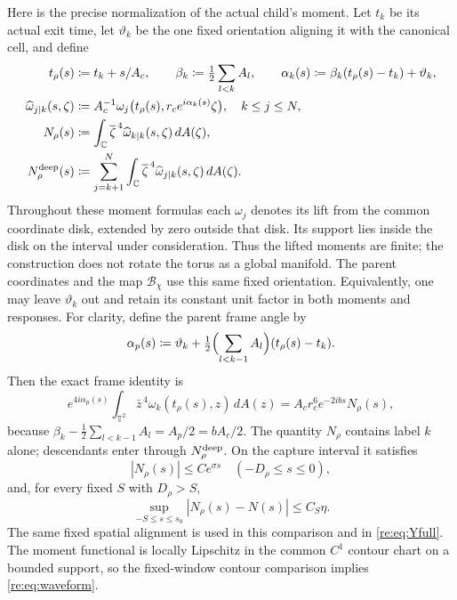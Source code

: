 \documentclass[11pt]{amsart}
\theoremstyle{remark}
\numberwithin{equation}{section}
\newcommand{\C}{\mathbb C}
\newcommand{\T}{\mathbb T}
\begin{document}
Here is the precise normalization of the actual child's moment.
Let $t_k$ be its actual exit time, let $\vartheta_k$ be the one fixed
orientation aligning it with the canonical cell, and define
\begin{align}\label{re:def:normalized-moment}
 t_\rho(s)&\coloneqq t_k+s/A_c,\qquad
 \beta_k\coloneqq\tfrac12\sum_{l<k}A_l,\qquad
 \alpha_k(s)\coloneqq\beta_k(t_\rho(s)-t_k)+\vartheta_k,\\
 \widehat\omega_{j\mid k}(s,\zeta)
 &\coloneqq A_c^{-1}\omega_j\bigl(t_\rho(s),
                  r_c e^{i\alpha_k(s)}\zeta\bigr),\quad k\le j\le N,
 \nonumber\\
 N_\rho(s)&\coloneqq\int_\C\overline\zeta^{\,4}
                        \widehat\omega_{k\mid k}(s,\zeta)\,dA(\zeta),
 \nonumber\\
 N_\rho^{\rm deep}(s)&\coloneqq\sum_{j=k+1}^N\int_\C
       \overline\zeta^{\,4}\widehat\omega_{j\mid k}(s,\zeta)\,dA(\zeta).
 \nonumber
\end{align}
Throughout these moment formulas each $\omega_j$ denotes its lift from the common
coordinate disk, extended by zero outside that disk. Its support lies
inside the disk on the interval under consideration. Thus the lifted
moments are finite; the construction does not rotate the torus as a
global manifold.
The parent coordinates and the map $\mathcal B_\chi$ use this same
fixed orientation. Equivalently, one may leave $\vartheta_k$ out and
retain its constant unit factor in both moments and responses.
For clarity, define the parent frame angle by
\[
 \alpha_p(s)\coloneqq\vartheta_k+
       \tfrac12\Bigl(\sum_{l<k-1}A_l\Bigr)(t_\rho(s)-t_k).
\]
Then the exact frame identity is
\begin{equation}\label{re:def:frame-identity}
 e^{4i\alpha_p(s)}\int_{\T^2}\bar z^{\,4}
       \omega_k(t_\rho(s),z)\,dA(z)
 =A_cr_c^6 e^{-2ibs}N_\rho(s),
\end{equation}
because $\beta_k-\tfrac12\sum_{l<k-1}A_l=A_p/2=bA_c/2$.
The quantity $N_\rho$ contains label $k$ alone; descendants enter
through $N_\rho^{\rm deep}$. On the capture interval it satisfies
\[
 |N_\rho(s)|\leq C e^{\sigma s}\quad(-D_\rho\leq s\leq0),
\]
and, for every fixed $S$ with $D_\rho>S$,
\begin{equation}\label{re:eq:waveform}
 \sup_{-S\leq s\leq s_0}|N_\rho(s)-N(s)|\leq C_S\eta.
\end{equation}
The same fixed spatial alignment is used in this comparison and in
\eqref{re:eq:Yfull}. The moment functional is locally Lipschitz in
the common $C^1$ contour chart on a bounded support, so the
fixed-window contour comparison implies \eqref{re:eq:waveform}.
\end{document}
